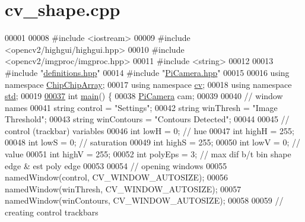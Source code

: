 \hypertarget{cv__shape_8cpp_source}{\section{cv\+\_\+shape.\+cpp}
\label{cv__shape_8cpp_source}
}

\begin{DoxyCode}
00001 
00008 \textcolor{preprocessor}{#include <iostream>}
00009 \textcolor{preprocessor}{#include <opencv2/highgui/highgui.hpp>}
00010 \textcolor{preprocessor}{#include <opencv2/imgproc/imgproc.hpp>}
00011 \textcolor{preprocessor}{#include <string>}
00012 
00013 \textcolor{preprocessor}{#include "\hyperlink{definitions_8hpp}{definitions.hpp}"}
00014 \textcolor{preprocessor}{#include "\hyperlink{PiCamera_8hpp}{PiCamera.hpp}"}
00015 
00016 \textcolor{keyword}{using namespace }\hyperlink{namespaceChipChipArray}{ChipChipArray};
00017 \textcolor{keyword}{using namespace }\hyperlink{namespacecv}{cv};
00018 \textcolor{keyword}{using namespace }\hyperlink{namespacestd}{std};
00019 
\hypertarget{cv__shape_8cpp_source_l00037}{}\hyperlink{cv__shape_8cpp_ae66f6b31b5ad750f1fe042a706a4e3d4}{00037} \textcolor{keywordtype}{int} \hyperlink{namespaceChipChipArray_a7fc3d1edffca11531cd09fdab7c8b88d}{main}() \{
00038     \hyperlink{classChipChipArray_1_1PiCamera}{PiCamera} cam;
00039 
00040     \textcolor{comment}{// window names}
00041     \textcolor{keywordtype}{string} control = \textcolor{stringliteral}{"Settings"};
00042     \textcolor{keywordtype}{string} winThresh = \textcolor{stringliteral}{"Image Threshold"};
00043     \textcolor{keywordtype}{string} winContours = \textcolor{stringliteral}{"Contours Detected"};
00044 
00045     \textcolor{comment}{// control (trackbar) variables}
00046     \textcolor{keywordtype}{int} lowH = 0;  \textcolor{comment}{// hue}
00047     \textcolor{keywordtype}{int} highH = 255;
00048     \textcolor{keywordtype}{int} lowS = 0;  \textcolor{comment}{// saturation}
00049     \textcolor{keywordtype}{int} highS = 255;
00050     \textcolor{keywordtype}{int} lowV = 0;  \textcolor{comment}{// value}
00051     \textcolor{keywordtype}{int} highV = 255;
00052     \textcolor{keywordtype}{int} polyEps = 3;  \textcolor{comment}{// max dif b/t bin shape edge & est poly edge}
00053 
00054     \textcolor{comment}{// opening windows}
00055     namedWindow(control, CV\_WINDOW\_AUTOSIZE);
00056     namedWindow(winThresh, CV\_WINDOW\_AUTOSIZE);
00057     namedWindow(winContours, CV\_WINDOW\_AUTOSIZE);
00058 
00059     \textcolor{comment}{// creating control trackbars}

\end{DoxyCode}
